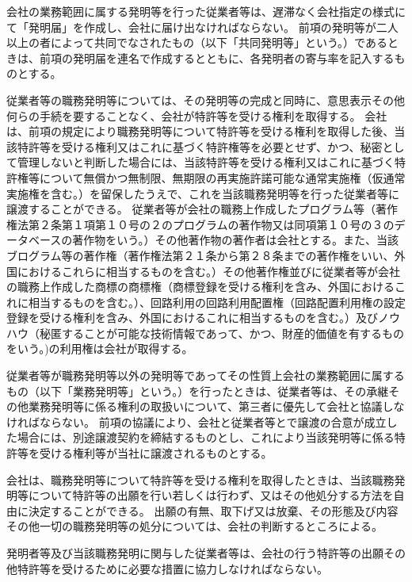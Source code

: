 \documentclass[10pt,a4paper,uplatex]{jsarticle}
\begin{document}
会社の業務範囲に属する発明等を行った従業者等は、遅滞なく会社指定の様式にて「発明届」を作成し、会社に届け出なければならない。
\label{para:invention_notice}
\term 前項の発明等が二人以上の者によって共同でなされたもの（以下「共同発明等」という。）であるときは、前項の発明届を連名で作成するとともに、各発明者の寄与率を記入するものとする。

従業者等の職務発明等については、その発明等の完成と同時に、意思表示その他何らの手続を要することなく、会社が特許等を受ける権利を取得する。
\term 会社は、前項の規定により職務発明等について特許等を受ける権利を取得した後、当該特許等を受ける権利又はこれに基づく特許権等を必要とせず、かつ、秘密として管理しないと判断した場合には、当該特許等を受ける権利又はこれに基づく特許権等について無償かつ無制限、無期限の再実施許諾可能な通常実施権（仮通常実施権を含む。）を留保したうえで、これを当該職務発明等を行った従業者等に譲渡することができる。
\term 従業者等が会社の職務上作成したプログラム等（著作権法第２条第１項第１０号の２のプログラムの著作物又は同項第１０号の３のデータベースの著作物をいう。）その他著作物の著作者は会社とする。また、当該ブログラム等の著作権（著作権法第２１条から第２８条までの著作権をいい、外国におけるこれらに相当するものを含む。）その他著作権並びに従業者等が会社の職務上作成した商標の商標権（商標登録を受ける権利を含み、外国におけるこれに相当するものを含む。）、回路利用の回路利用配置権（回路配置利用権の設定登録を受ける権利を含み、外国におけるこれに相当するものを含む。）及びノウハウ（秘匿することが可能な技術情報であって、かつ、財産的価値を有するものをいう。)の利用権は会社が取得する。

従業者等が職務発明等以外の発明等であってその性質上会社の業務範囲に属するもの（以下「業務発明等」という。）を行ったときは、従業者等は、その承継その他業務発明等に係る権利の取扱いについて、第三者に優先して会社と協議しなければならない。
\term 前項の協議により、会社と従業者等とで譲渡の合意が成立した場合には、別途譲渡契約を締結するものとし、これにより当該発明等に係る特許等を受ける権利等が当社に譲渡されるものとする。

会社は、職務発明等について特許等を受ける権利を取得したときは、当該職務発明等について特許等の出願を行い若しくは行わず、又はその他処分する方法を自由に決定することができる。
\term 出願の有無、取下げ又は放棄、その形態及び内容その他一切の職務発明等の処分については、会社の判断するところによる。

発明者等及び当該職務発明に関与した従業者等は、会社の行う特許等の出願その他特許等を受けるために必要な措置に協力しなければならない。
\end{document}
